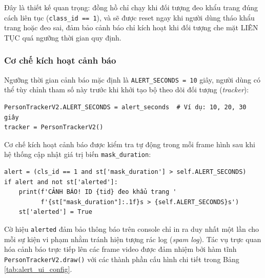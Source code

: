 \documentclass[a4paper,12pt]{article}
\begin{document}
Đây là thiết kế quan trọng: đồng hồ chỉ chạy khi đối tượng đeo khẩu trang đúng cách liên tục (\texttt{class\_id == 1}), và sẽ được reset ngay khi người dùng tháo khẩu trang hoặc đeo sai, đảm bảo cảnh báo chỉ kích hoạt khi đối tượng che mặt LIÊN TỤC quá ngưỡng thời gian quy định.

\subsubsection{Cơ chế kích hoạt cảnh báo}

Ngưỡng thời gian cảnh báo mặc định là \texttt{ALERT\_SECONDS = 10} giây, người dùng có thể tùy chỉnh tham số này trước khi khởi tạo bộ theo dõi đối tượng (\textit{tracker}):

\begin{verbatim}
PersonTrackerV2.ALERT_SECONDS = alert_seconds  # Ví dụ: 10, 20, 30 giây
tracker = PersonTrackerV2()
\end{verbatim}

Cơ chế kích hoạt cảnh báo được kiểm tra tự động trong mỗi frame hình sau khi hệ thống cập nhật giá trị biến \texttt{mask\_duration}:

\begin{verbatim}
alert = (cls_id == 1 and st['mask_duration'] > self.ALERT_SECONDS)
if alert and not st['alerted']:
    print(f'CẢNH BÁO! ID {tid} đeo khẩu trang '
          f'{st["mask_duration"]:.1f}s > {self.ALERT_SECONDS}s')
    st['alerted'] = True
\end{verbatim}

Cờ hiệu \texttt{alerted} đảm bảo thông báo trên console chỉ in ra duy nhất một lần cho mỗi sự kiện vi phạm nhằm tránh hiện tượng rác log (\textit{spam log}). Tác vụ trực quan hóa cảnh báo trực tiếp lên các frame video được đảm nhiệm bởi hàm tĩnh \texttt{PersonTrackerV2.draw()} với các thành phần cấu hình chi tiết trong Bảng \ref{tab:alert_ui_config}.
\end{document}
